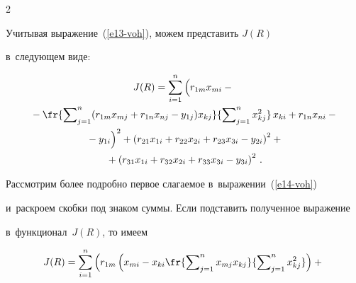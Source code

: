 \begin{multicols}{2}
  

  Учитывая выражение~(\ref{e13-voh}), можем пред\-ста\-вить $J(R)$ 

в~сле\-ду\-ющем виде:



\noindent

  \begin{multline}

  J(R)= \sum\limits^n_{i=1} \left(

  \vphantom{\fr{\sum\nolimits^n_{j=1} (r_{1{m}}x_{{m}j}+r_{1{n}} 

x_{{n}j}-y_{1j})x_{kj}}{\sum\nolimits^n_{j=1} x^2_{kj}}}

 r_{1{m}}x_{{m}i}-{}\right.\\

  {}-

\fr{\sum\nolimits^n_{j=1} (r_{1{m}}x_{{m}j}+r_{1{n}} 

x_{{n}j}-y_{1j})x_{kj}}{\sum\nolimits^n_{j=1} x^2_{kj}}\,x_{ki} 

+r_{1{n}} x_{{n}i} -{}\\

\left.{}-y_{1i}

  \vphantom{\fr{\sum\nolimits^n_{j=1} (r_{1\mathrm{m}}x_{\mathrm{m}j}+r_{1\mathrm{n}} 

x_{\mathrm{n}j}-y_{1j})x_{kj}}{\sum\nolimits^n_{j=1} x^2_{kj}}}

\right)^2+  \left( r_{21}x_{1i}+r_{22}x_{2i}+r_{23}x_{3i}-y_{2i}\right)^2+{}\\

  {}+ \left(  r_{31}x_{1i} +r_{32}x_{2i}+r_{33} x_{3i} -y_{3i}\right)^2\,.

  \label{e14-voh}

  \end{multline}

  

  Рассмотрим более подробно первое сла\-га\-емое в~выражении~(\ref{e14-voh}) 

и~раскроем скоб\-ки под знаком суммы. Если подставить полученное выражение 

в~функционал~$J(R)$, то имеем

  \begin{multline}

  J(R)=\sum\limits^n_{i=1}\left( r_{1m}\left(

  x_{mi}-x_{ki}\fr{\sum\nolimits^n_{j=1} x_{mj} x_{kj}}

  {\sum\nolimits^n_{j=1} x^2_{kj}}\right)

  +{}\right.\\


\end{multline}
\end{multicols}
